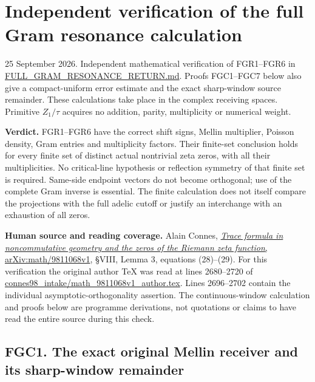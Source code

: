 \section{Independent verification of the full Gram resonance
calculation}\label{independent-verification-of-the-full-gram-resonance-calculation}

25 September 2026. Independent mathematical verification of FGR1--FGR6
in
\href{https://github.com/KokunoYumeto/zeta-function-research-reader/blob/main/workbenches/splitzero-tandem/continuations/20260925-full-source-tensor-and-original-divisor/counterfactual/FULL_GRAM_RESONANCE_RETURN.md}{FULL\_GRAM\_RESONANCE\_RETURN.md}.
Proofs FGC1--FGC7 below also give a compact-uniform error estimate and
the exact sharp-window source remainder. These calculations take place
in the complex receiving spaces. Primitive \(Z_1/\tau\) acquires no
addition, parity, multiplicity or numerical weight.

\textbf{Verdict.} FGR1--FGR6 have the correct shift signs, Mellin
multiplier, Poisson density, Gram entries and multiplicity factors.
Their finite-set conclusion holds for every finite set of distinct
actual nontrivial zeta zeros, with all their multiplicities. No
critical-line hypothesis or reflection symmetry of that finite set is
required. Same-side endpoint vectors do not become orthogonal; use of
the complete Gram inverse is essential. The finite calculation does not
itself compare the projections with the full adelic cutoff or justify an
interchange with an exhaustion of all zeros.

\textbf{Human source and reading coverage.} Alain Connes,
\href{https://arxiv.org/abs/math/9811068v1}{\emph{Trace formula in
noncommutative geometry and the zeros of the Riemann zeta function},
arXiv:math/9811068v1}, §VIII, Lemma 3, equations (28)--(29). For this
verification the original author TeX was read at lines 2680--2720 of
\href{https://arxiv.org/abs/math/9811068v1}{connes98\_intake/math\_9811068v1\_author.tex}.
Lines 2696--2702 contain the individual asymptotic-orthogonality
assertion. The continuous-window calculation and proofs below are
programme derivations, not quotations or claims to have read the entire
source during this check.

\subsection{FGC1. The exact original Mellin receiver and its
sharp-window
remainder}\label{fgc1.-the-exact-original-mellin-receiver-and-its-sharp-window-remainder}

